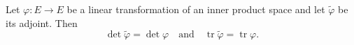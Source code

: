Let $\varphi: E \rightarrow E$ be a linear transformation of an inner product space and let $\tilde{\varphi}$ be its adjoint. Then
$$\det \tilde{\varphi} = \det \varphi \quad \text{and} \quad \operatorname{tr} \tilde{\varphi} = \operatorname{tr} \varphi.$$
